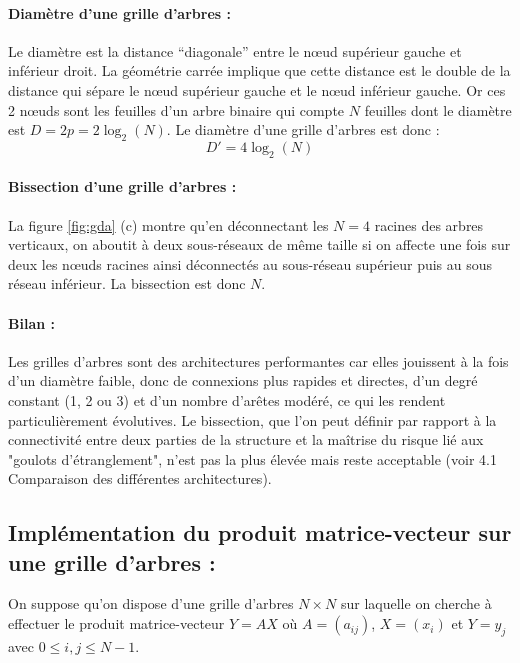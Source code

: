 \paragraph{Diamètre d'une grille d'arbres : } Le diamètre est la distance ``diagonale'' entre le nœud supérieur gauche et inférieur droit. La géométrie
carrée implique que cette distance est le double de la distance qui sépare le nœud supérieur gauche et le nœud inférieur gauche. Or ces 2
nœuds sont les feuilles d'un arbre binaire qui compte $N$ feuilles dont le diamètre est $D = 2p = 2\log_2(N)$. Le diamètre d'une grille d'arbres
est donc : \[D' = 4\log_2(N)\] 

\paragraph{Bissection d'une grille d'arbres : } La figure \ref{fig:gda} (c) montre qu'en déconnectant les $N = 4$ racines des arbres verticaux, 
on aboutit à deux sous-réseaux de même taille si on affecte une fois sur deux les nœuds racines ainsi déconnectés au
sous-réseau supérieur puis au sous réseau inférieur. La bissection est donc $N$.

\paragraph{Bilan : } Les grilles d'arbres sont des architectures performantes car elles jouissent à la fois d'un diamètre faible, donc de connexions 
plus rapides et directes, d'un degré constant (1, 2 ou 3) et d'un nombre d'arêtes modéré, ce qui les rendent particulièrement évolutives. Le bissection, que l'on peut définir par rapport à la connectivité entre deux parties de la structure et la maîtrise du risque lié aux "goulots d'étranglement", n'est pas la plus élevée mais reste acceptable (voir 4.1 Comparaison des différentes architectures).


\subsection{Implémentation du produit matrice-vecteur sur une grille d'arbres : }

On suppose qu'on dispose d'une grille d'arbres $N \times N$ sur laquelle on cherche à effectuer le produit matrice-vecteur $Y = AX$ où $A = (a_{ij})$, $X = (x_i)$
et $Y=y_j$ avec $0\leq i,j\leq N-1$. 


